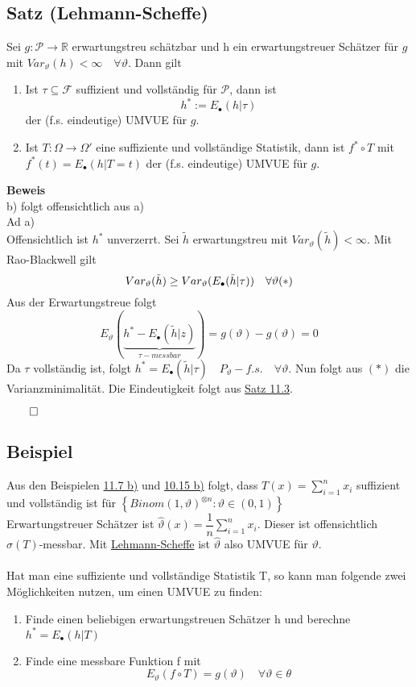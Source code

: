 \documentclass[german,10pt,oneside, fleqn, a4paper]{article}
\newcommand {\R}	{\mathbb{R}}
\newcommand{\ra}{\rightarrow}
\newcommand{\sm}[2][\infty]{\sum\limits_{#2}^{#1}}
\newcommand{\brac}[1]{\left\lbrace #1\right\rbrace}
\newcommand{\QED}{\begin{flushright}$\qed$\end{flushright}}
\newcommand{\mc}[1]{\mathcal{#1}}
\newcommand{\beweis}{\textbf{Beweis}\\}
\newcommand{\1}[1]{1_{#1}}
\newcommand{\2}[1]{\1{\brac{#1}}}
\newcommand{\f}{\mc{F}}
\newcommand{\sumi}{\sm[n]{i=1}}
\newcommand{\stuff}{{\otimes n}}
\begin{document}
\subsection{Satz (Lehmann-Scheffe)}
\label{11.8}
Sei $g:\mc{P}\ra\R$ erwartungstreu schätzbar und h ein erwartungstreuer Schätzer für $g$ mit $Var_\vartheta(h)<\infty\quad\forall\vartheta$. Dann gilt\begin{enumerate}[label=(\alph*)]
\item Ist $\tau\subseteq\f$ suffizient und vollständig für $\mc{P}$, dann ist \[
h^*:=E_\bullet(h|\tau)\]
der (f.s. eindeutige) UMVUE für $g$.
\item Ist $T:\Omega\ra\Omega'$ eine suffiziente und vollständige Statistik, dann ist $f^*\circ T$ mit $f^*(t)=E_\bullet(h|T=t)$ der (f.s. eindeutige) UMVUE für $g$.
\end{enumerate}
\beweis
b) folgt offensichtlich aus a)\\
Ad a)\\
Offensichtlich ist $h^*$ unverzerrt. Sei $\tilde{h}$ erwartungstreu mit $Var_\vartheta(\tilde{h})<\infty$. Mit Rao-Blackwell gilt \[
Var_\vartheta(\tilde{h})\geq Var_\vartheta(E_\bullet(\tilde{h}|\tau))\quad\forall\vartheta\hfill(*)\]
Aus der Erwartungstreue folgt \[
E_\vartheta(\underbrace{h^*-E_\bullet(\tilde{h}|z)}_{\tau-messbar})=g(\vartheta)-g(\vartheta)=0\]
Da $\tau$ vollständig ist, folgt $h^*=E_\bullet(\tilde{h}|\tau)\quad P_\vartheta-f.s.\quad\forall\vartheta$. Nun folgt aus $(*)$ die Varianzminimalität. Die Eindeutigkeit folgt aus \hyperref[11.3]{Satz 11.3}.\QED


\subsection{Beispiel}
\label{11.9}
Aus den Beispielen \hyperref[11.7]{11.7 b)} und \hyperref[10.15]{10.15 b)} folgt, dass $T(x)=\sumi x_i$ suffizient und vollständig ist für $\brac{Binom(1,\vartheta)^\stuff:\vartheta\in(0,1)}$\\
Erwartungstreuer Schätzer ist $\widehat{\vartheta}(x)=\dfrac{1}{n}\sumi x_i$. Dieser ist offensichtlich $\sigma(T)$-messbar. Mit \hyperref[11.8]{Lehmann-Scheffe} ist $\widehat{\vartheta}$ also UMVUE für $\vartheta$.\\
\\
Hat man eine suffiziente und vollständige Statistik T, so kann man folgende zwei Möglichkeiten nutzen, um einen UMVUE zu finden:\begin{enumerate}[label=(\roman*)]
\item Finde einen beliebigen erwartungstreuen Schätzer h und berechne\\ $h^*=E_\bullet(h|T)$
\item Finde eine messbare Funktion f mit \[E_\vartheta(f\circ T)=g(\vartheta)\quad\forall\vartheta\in\theta\]
\end{enumerate}
\end{document}
